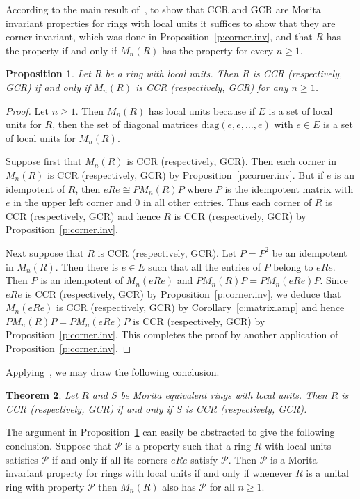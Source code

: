 \documentclass[11pt,reqno]{amsart}
\newtheorem{thm}{Theorem}[section]
\theoremstyle{plain}
\newtheorem{prop}[thm]{Proposition}
\numberwithin{equation}{section}
\begin{document}
According to the main result of~\cite{SS16}, to show that CCR and GCR are Morita invariant properties for rings with local units it suffices to show that they are corner invariant, which was done in Proposition~\ref{p:corner.inv}, and that $R$ has the property if and only if $M_n(R)$ has the property for every $n\geq 1$.

\begin{prop}\label{p:matrix.inv}
Let $R$ be a ring with local units.  Then $R$ is CCR  (respectively, GCR) if and only if $M_n(R)$ is CCR (respectively, GCR) for any $n\geq 1$.
\end{prop}
\begin{proof}
Let $n\geq 1$.  Then $M_n(R)$ has local units because if $E$ is a set of local units for $R$, then the set of diagonal matrices $\mathrm{diag}(e,e,\ldots, e)$ with $e\in E$ is a set of local units for $M_n(R)$.

Suppose first that $M_n(R)$ is CCR (respectively, GCR).  Then each corner in $M_n(R)$ is CCR (respectively, GCR) by Proposition~\ref{p:corner.inv}.  But if $e$ is an idempotent of $R$, then $eRe\cong PM_n(R)P$ where $P$ is the idempotent matrix with $e$ in the upper left corner and $0$ in all other entries.  Thus each corner of $R$ is CCR (respectively, GCR) and hence $R$ is CCR (respectively, GCR) by Proposition~\ref{p:corner.inv}.

Next suppose that $R$ is CCR (respectively, GCR).  Let $P=P^2$ be an idempotent in $M_n(R)$.  Then there is $e\in E$ such that all the entries of $P$ belong to $eRe$.   Then $P$ is an idempotent of $M_n(eRe)$ and $PM_n(R)P=PM_n(eRe)P$.  Since $eRe$ is CCR (respectively, GCR) by Proposition~\ref{p:corner.inv}, we deduce that $M_n(eRe)$ is CCR (respectively, GCR) by Corollary~\ref{c:matrix.amp} and hence $PM_n(R)P=PM_n(eRe)P$ is CCR (respectively, GCR) by Proposition~\ref{p:corner.inv}.  This completes the proof by another application of Proposition~\ref{p:corner.inv}.
\end{proof}

Applying~\cite[Theorem~5.4]{SS16}, we may draw the following conclusion.

\begin{thm}\label{t:morita}
Let $R$ and $S$ be Morita equivalent rings with local units.  Then $R$ is CCR (respectively, GCR) if and only if $S$ is CCR (respectively, GCR).
\end{thm}

\begin{remark}\label{r:morita.ref}
The argument in Proposition~\ref{p:matrix.inv} can easily be abstracted to give the following conclusion. Suppose
that $\mathcal P$ is a property such that a ring $R$
with local units satisfies $\mathcal P$ if and only if all its corners $eRe$ satisfy $\mathcal P$. Then
$\mathcal P$ is a Morita-invariant property for rings with local units if and only if
whenever $R$ is a unital ring with property $\mathcal P$ then $M_n(R)$  also has $\mathcal P$ for all $n\geq 1$.
\end{remark}
\end{document}
